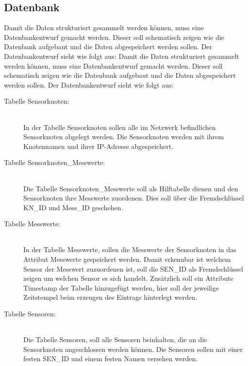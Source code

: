 \subsection{Datenbank}
Damit die Daten strukturiert gesammelt werden können, muss eine Datenbankentwurf gemacht werden. Dieser soll schematisch zeigen wie die Datenbank aufgebaut und die Daten abgespeichert werden sollen. Der Datenbankentwurf sieht wie folgt aus:
Damit die Daten strukturiert gesammelt werden können, muss eine Datenbankentwurf gemacht werden. Dieser soll schematisch zeigen wie die Datenbank aufgebaut und die Daten abgespeichert werden sollen. Der Datenbankentwurf sieht wie folgt aus:
\begin{description}
	\item[Tabelle Sensorknoten:] \hfill \\
		In der Tabelle Sensorknoten sollen alle im Netzwerk befindlichen Sensorknoten abgelegt werden. Die Sensorknoten werden mit ihrem Knotennamen und ihrer IP-Adresse abgespeichert.
	\item[Tabelle Sensorknoten\_Messwerte:] \hfill \\
		Die Tabelle Sensorknoten\_Messwerte soll als Hilftabelle dienen und den Sensorknoten ihre Messwerte zuordenen. Dies soll über die Fremdschlüssel KN\_ID und Mess\_ID geschehen.
	\item[Tabelle Messwerte:] \hfill \\
		In der Tabelle Messwerte, sollen die Messwerte der Sensorknoten in das Attribut Messwerte gespeichert werden. Damit erkennbar ist welchem Sensor der Messwert zuzuordenen ist, soll die SEN\_ID als Fremdschlüssel zeigen um welchen Sensor es sich handelt. Zusätzlich soll ein Attribute Timestamp der Tabelle hinzugefügt werden, hier soll der jeweilige Zeitstempel beim erzeugen des Eintrags hinterlegt werden.
	\item[Tabelle Sensoren:] \hfill \\	
		Die Tabelle Sensoren, soll alle Sensoren beinhalten, die an die Sensorknoten angeschlossen werden können. Die Sensoren sollen mit einer festen SEN\_ID und einem festen Namen versehen werden.
\end{description}

